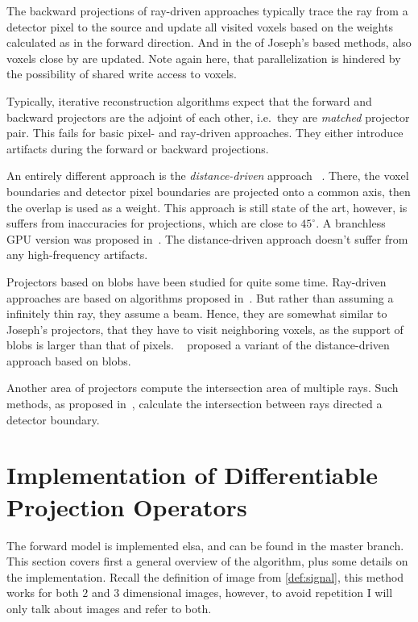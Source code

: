 The backward projections of ray-driven approaches typically trace the ray from a detector pixel to
the source and update all visited voxels based on the weights calculated as in the forward
direction. And in the of Joseph's based methods, also voxels close by are updated. Note again here,
that parallelization is hindered by the possibility of shared write access to voxels.

Typically, iterative reconstruction algorithms expect that the forward and backward projectors are
the adjoint of each other, i.e.\ they are \textit{matched} projector pair. This fails for basic
pixel- and ray-driven approaches. They either introduce artifacts during the forward or backward
projections.

An entirely different approach is the \textit{distance-driven} approach
~\cite{de_man_distance-driven_2002, de_man_distance-driven_2004}. There, the voxel boundaries and
detector pixel boundaries are projected onto a common axis, then the overlap is used as a weight.
This approach is still state of the art, however, is suffers from inaccuracies for projections, which
are close to \(45^\circ\). A branchless \gls{GPU} version was proposed in~\cite{liu_gpu-based_2017}. The
distance-driven approach doesn't suffer from any high-frequency artifacts.

Projectors based on blobs have been studied for quite some time. Ray-driven approaches are based on
algorithms proposed in~\cite{matej_practical_1996, popescu_ray_2004}. But rather than assuming a
infinitely thin ray, they assume a beam. Hence, they are somewhat similar to Joseph's projectors,
that they have to visit neighboring voxels, as the support of blobs is larger than that of pixels.
~\cite{levakhina_distance-driven_2010} proposed a variant of the distance-driven approach based on
blobs.

Another area of projectors compute the intersection area of multiple rays. Such methods, as proposed
in~\cite{ha_study_2015, ha_efficient_2016, ha_look-up_2018}, calculate the intersection between rays
directed a detector boundary.

\section{Implementation of Differentiable Projection Operators}\label{sec:implementation}

The forward model is implemented elsa, and can be found in the master branch. This section covers
first a general overview of the algorithm, plus some details on the implementation. Recall the
definition of image from \autoref{def:signal}, this method works for both \(2\) and \(3\) dimensional
images, however, to avoid repetition I will only talk about images and refer to both.

